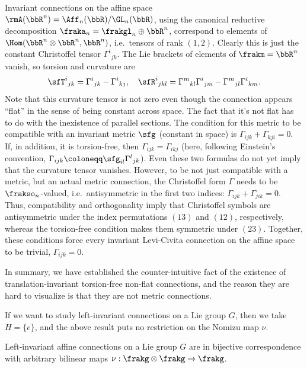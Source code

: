 \begin{example}
    Invariant connections on the affine space $\rmA(\bbR^n)=\Aff_n(\bbR)\slash \GL_n(\bbR)$, using the canonical reductive decomposition $\fraka_n=\frakgl_n\oplus \bbR^n$, correspond to elements of $\Hom(\bbR^n\otimes \bbR^n,\bbR^n)$, i.e.\ tensors of rank $(1,2)$. Clearly this is just the constant Christoffel tensor $\Gamma^i{}_{jk}$. The Lie brackets of elements of $\frakm=\bbR^n$ vanish, so torsion and curvature are 
    \[\sfT^i{}_{jk}=\Gamma^i{}_{jk}-\Gamma^i{}_{kj},\quad \sfR^i{}_{jkl}=\Gamma^m{}_{kl}\Gamma^i{}_{jm}-\Gamma^m{}_{jl}\Gamma^i{}_{km}.\] 
    Note that this curvature tensor is not zero even though the connection appears ``flat'' in the sense of being constant across space. The fact that it's not flat has to do with the inexistence of parallel sections. The condition for this metric to be compatible with an invariant metric $\sfg$ (constant in space) is $\Gamma_{ijk}+\Gamma_{kji}=0$. If, in addition, it is torsion-free, then $\Gamma_{ijk}=\Gamma_{ikj}$ (here, following Einstein's convention, $\Gamma_{ijk}\coloneqq \sfg_{il}\Gamma^l{}_{jk}$). Even these two formulas do not yet imply that the curvature tensor vanishes. However, to be not just compatible with a metric, but an actual metric connection, the Christoffel form $\Gamma$ needs to be $\frakso_n$-valued, i.e.\ antisymmetric in the first two indices: $\Gamma_{ijk}+\Gamma_{jik}=0$. Thus, compatibility and orthogonality imply that Christoffel symbols are antisymmetric under the index permutations $(13)$ and $(12)$, respectively, whereas the torsion-free condition makes them symmetric under $(23)$. Together, these conditions force every invariant Levi-Civita connection on the affine space to be trivial, $\Gamma_{ijk}=0$.

    In summary, we have established the counter-intuitive fact of the existence of translation-invariant torsion-free non-flat connections, and the reason they are hard to visualize is that they are not metric connections.
\end{example}

If we want to study left-invariant connections on a Lie group $G$, then we take $H=\{e\}$, and the above result puts no restriction on the Nomizu map $\nu$.

\begin{cor}
    Left-invariant affine connections on a Lie group $G$ are in bijective correspondence with arbitrary bilinear maps $\nu:\frakg\otimes\frakg\to \frakg$.
\end{cor}

